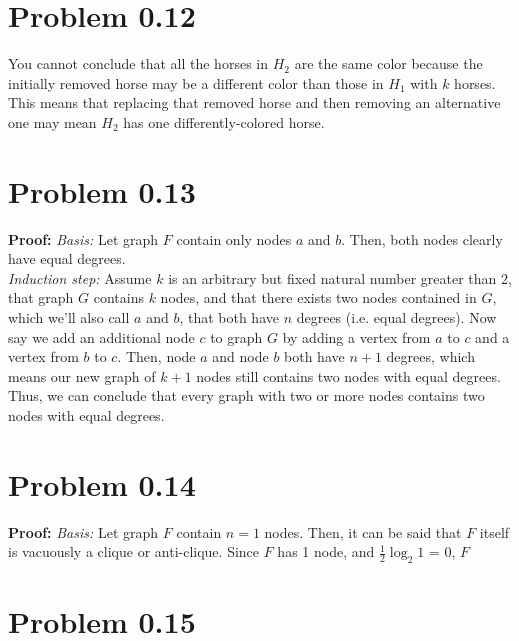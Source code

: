 \documentclass{article}
\begin{document}
\section{Problem 0.12}
You cannot conclude that all the horses in $H_2$ are the same color because
the initially removed horse may be a different color than those in $H_1$ with $k$ horses. This means that replacing that removed horse and then removing an alternative one may mean $H_2$ has one differently-colored horse.
\section{Problem 0.13}
\textbf{Proof:} \textit{Basis:} Let graph $F$ contain only nodes $a$ and $b$. Then, both nodes clearly have equal degrees.
\\\textit{Induction step:} Assume $k$ is an arbitrary but fixed natural number greater than $2$, that graph $G$ contains $k$ nodes, and that there exists two nodes contained in $G$, which we'll also call $a$ and $b$, that both have $n$ degrees (i.e. equal degrees).
Now say we add an additional node $c$ to graph $G$ by adding a vertex from $a$ to $c$ and a vertex from $b$ to $c$. Then, node $a$ and node $b$ both have $n + 1$ degrees, which means our new graph of $k + 1$ nodes still contains two nodes with equal degrees.
Thus, we can conclude that every graph with two or more nodes contains two nodes with equal degrees.
\section{Problem 0.14}
\textbf{Proof:} \textit{Basis:} Let graph $F$ contain $n = 1$ nodes. Then, it can be said that $F$ itself is vacuously a clique or anti-clique.
Since $F$ has 1 node, and $\frac{1}{2}\log_{2} 1$ = 0, $F$ 
\section{Problem 0.15}
\end{document}
